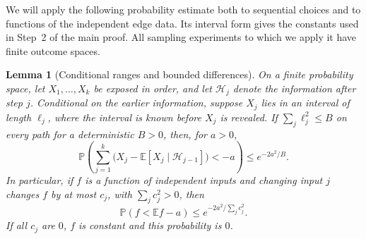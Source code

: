 \documentclass[11pt,a4paper]{article}
\newtheorem{lemma}[theorem]{Lemma}
\theoremstyle{definition}
\theoremstyle{remark}
\newcommand{\E}{\mathbb E}
\newcommand{\Prb}{\mathbb P}
\begin{document}
\begin{samepage}
We will apply the following probability estimate both to sequential
choices and to functions of the independent edge data. Its interval
form gives the constants used in Step~2 of the main proof. All sampling
experiments to which we apply it have finite outcome spaces.

\begin{lemma}[Conditional ranges and bounded differences]\label{lem:random_ranges}
On a finite probability space, let $X_1,\ldots,X_k$ be exposed in order,
and let $\mathcal H_j$ denote the information after step $j$. Conditional on the earlier information,
suppose $X_j$ lies in an interval of length $\ell_j$,
where the interval is known before $X_j$ is revealed. If
$\sum_j\ell_j^2\le B$ on every path for a deterministic $B>0$, then,
for $a>0$,
\[
 \Prb\left(\sum_{j=1}^k
       \bigl(X_j-\E[X_j\mid\mathcal H_{j-1}]\bigr)<-a\right)
 \le e^{-2a^2/B}.
\]
In particular, if $f$ is a function of independent inputs and changing
input $j$ changes $f$ by at most $c_j$, with $\sum_jc_j^2>0$, then
\[
\Prb(f<\E f-a)\le e^{-2a^2/\sum_jc_j^2}.
\]
If all $c_j$ are $0$, $f$ is constant and this probability is $0$.
\end{lemma}
\end{samepage}
\end{document}
